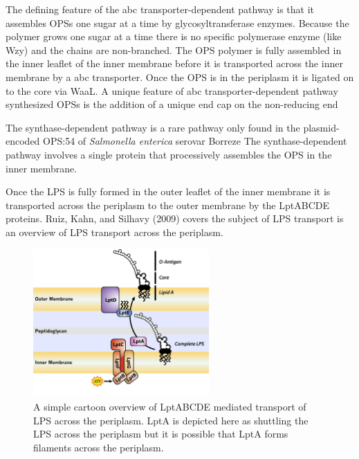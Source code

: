The defining feature of the \ac{abc} transporter-dependent pathway is that it
assembles \acp{OPS} one sugar at a time by glycosyltransferase enzymes. Because the polymer grows one sugar at a time there is no
specific polymerase enzyme (like Wzy) and the chains are non-branched. The \ac{OPS} polymer is fully assembled in the inner leaflet of the inner membrane before it is transported
across the inner membrane by a \ac{abc} transporter. Once the \ac{OPS} is in the periplasm it is ligated on to the core via WaaL. A unique feature of \ac{abc} transporter-dependent
pathway synthesized \acp{OPS} is the addition of a unique end cap on the non-reducing end

The synthase-dependent pathway is a rare pathway only found in the plasmid-encoded \ac{OPS}:54 of \textit{Salmonella enterica} serovar Borreze The
synthase-dependent pathway involves a single protein that processively assembles the \ac{OPS} in the inner membrane.

Once the \ac{LPS} is fully formed in the outer leaflet of the inner membrane it is transported across the periplasm to the outer membrane by the LptABCDE proteins. Ruiz, Kahn, and
Silhavy (2009) covers the subject of \ac{LPS} transport  is an overview of \ac{LPS} transport across the periplasm.
 
\begin{figure}[htb]
  	\begin{center}
   		\includegraphics[width=0.6\textwidth]{intro/img/lpstransport.pdf}
   	\end{center}
   	\caption[A simple overview of \ac{LPS} transport across the periplasm]{ A simple cartoon overview of LptABCDE mediated transport of \ac{LPS} across the periplasm. LptA is
depicted here as shuttling the \ac{LPS} across the periplasm but it is possible that LptA forms filaments across the periplasm.}
\label{fig:lpstransport}
\end{figure} %
